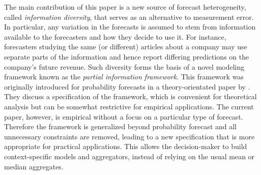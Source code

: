 \documentclass[11pt]{article}
\theoremstyle{definition}
\theoremstyle{definition}
\begin{document}
The main contribution of this paper is a new source of forecast heterogeneity, called \textit{information diversity}, that serves as an alternative to measurement error. In particular,  any variation in the forecasts is assumed to stem from information available to the forecasters and how they decide to use it. For instance, forecasters studying the same (or different) articles about a company may use separate parts of the information and hence report differing predictions on the company's future revenue. Such diversity forms the basis of a novel modeling framework known as the \textit{partial information framework}. This framework was originally introduced for probability forecasts in a theory-orientated paper by \cite{satopaamodeling}.  They discuss a specification of the framework, which is convenient for theoretical analysis but can be somewhat restrictive for empirical applications. The current paper, however, is empirical without a focus on a particular type of forecast. Therefore the framework is generalized beyond probability forecast and all unnecessary constraints are removed, leading to a new specification that is more appropriate for practical applications. This allows the decision-maker to build context-specific models and aggregators, instead of relying on the usual mean or median aggregates.









\end{document}
